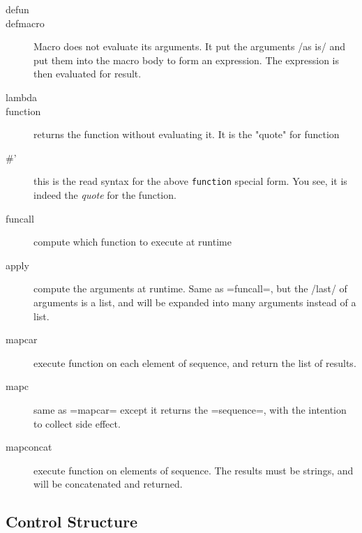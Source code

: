 \begin{description}
\item [defun ]
\item [defmacro ] Macro does not evaluate its
  arguments. It put the arguments /as is/ and put them into the macro
  body to form an expression.  The expression is then evaluated for
  result.

\item [lambda ]
\item [function ] returns the function without evaluating
  it. It is the "quote" for function
\item [\#'] this is the read syntax for the above \texttt{function}
  special form. You see, it is indeed the \textit{quote} for the
  function.

\item [funcall ] compute which function to execute
  at runtime
\item [apply ] compute the arguments at
  runtime. Same as =funcall=, but the /last/ of arguments is a list,
  and will be expanded into many arguments instead of a list.

\item [mapcar ] execute function on each element of
  sequence, and return the list of results.
\item [mapc ] same as =mapcar= except it returns the
  =sequence=, with the intention to collect side effect.
\item [mapconcat ] execute function on
  elements of sequence. The results must be strings, and will be
  concatenated and returned.
\end{description}



\subsection{Control Structure}

